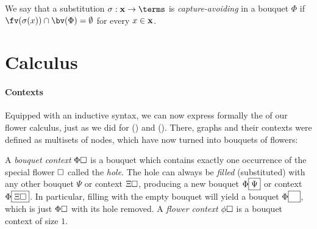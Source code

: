 \begin{definition}
  We say that a substitution $\sigma : \bx \to \terms$ is
  \emph{capture-avoiding} in a bouquet $\Phi$ if $\fv(\sigma(x)) \cap \bv(\Phi)
  = \emptyset$ for every $x \in \mathbf{x}$.
\end{definition}

\section{Calculus}

\paragraph{Contexts}

Equipped with an inductive syntax, we can now express formally the  of our flower calculus, just as we did for 
() and  (). There, graphs and their
contexts were defined as multisets of nodes, which have now turned into bouquets
of flowers:

\begin{definition}[Context]
  A \emph{bouquet context} $\Phi\square$ is a bouquet which contains exactly one
  occurrence of the special flower $\square$ called the \emph{hole}. The hole can
  always be \emph{filled} (substituted) with any other bouquet $\Psi$ or context
  $\Xi\square$, producing a new bouquet $\Phi\fbox{$\Psi$}$ or context
  $\Phi\fbox{$\Xi\square$}$. In particular, filling with the empty bouquet will
  yield a bouquet $\Phi\fbox{$\phantom{\Phi}$}$, which is just $\Phi\square$ with
  its hole removed. A \emph{flower context} $\phi\square$ is a bouquet context of
  size $1$.
\end{definition}

